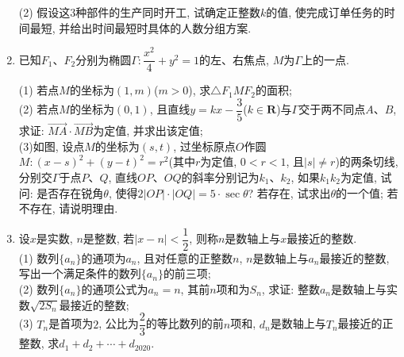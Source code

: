 \documentclass[10pt,a4paper]{article}
\begin{document}
\begin{enumerate}[1.]
(2) 假设这$3$种部件的生产同时开工, 试确定正整数$k$的值, 使完成订单任务的时间最短, 并给出时间最短时具体的人数分组方案.
\item 已知$F_1$、$F_2$分别为椭圆$\Gamma :\dfrac{x^2}4+y^2=1$的左、右焦点, $M$为$\Gamma$上的一点.
\begin{center}
\end{center}
(1) 若点$M$的坐标为$(1,m)$($m>0$), 求$\triangle F_1MF_2$的面积;\\
(2) 若点$M$的坐标为$(0,1)$, 且直线$y=kx-\dfrac 35$($k\in \mathbf{R}$)与$\Gamma$交于两不同点$A$、$B$, 求证: $\overrightarrow{MA}\cdot \overrightarrow{MB}$为定值, 并求出该定值;\\
(3)如图, 设点$M$的坐标为$(s,t)$, 过坐标原点$O$作圆$M:(x-s)^2+(y-t)^2=r^2$(其中$r$为定值, $0<r<1$, 且$|s|\ne r$)的两条切线, 分别交$\Gamma$于点$P$、$Q$, 直线$OP$、$OQ$的斜率分别记为$k_1$、$k_2$, 如果$k_1k_2$为定值, 试问: 是否存在锐角$\theta$, 使得$2|OP|\cdot|OQ|=5\cdot \sec \theta$? 若存在, 试求出$\theta$的一个值; 若不存在, 请说明理由.
\item 设$x$是实数, $n$是整数, 若$|x-n|<\dfrac 12$, 则称$n$是数轴上与$x$最接近的整数.\\
(1) 数列$\{a_n\}$的通项为$a_n$, 且对任意的正整数$n$, $n$是数轴上与$a_n$最接近的整数, 写出一个满足条件的数列$\{a_n\}$的前三项;\\
(2) 数列$\{a_n\}$的通项公式为$a_n=n$, 其前$n$项和为$S_n$, 求证: 整数$a_n$是数轴上与实数$\sqrt {2S_n}$最接近的整数;\\
(3) $T_n$是首项为$2$, 公比为$\dfrac 23$的等比数列的前$n$项和, $d_n$是数轴上与$T_n$最接近的正整数, 求$d_1+d_2+\cdots +d_{2020}$.



\end{enumerate}
\iffalse






























\fi
\end{document}
